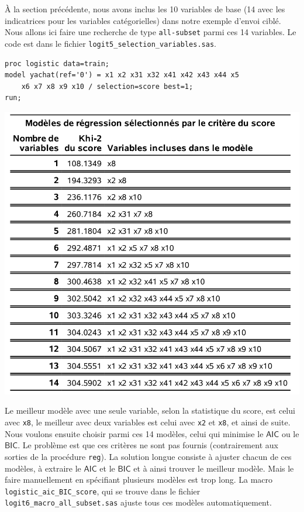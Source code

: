 \documentclass[
  11pt,
  letterpaper,
]{book}
\theoremstyle{definition}
\theoremstyle{definition}
\theoremstyle{definition}
\theoremstyle{remark}
\begin{document}
À la section précédente, nous avons inclus les 10 variables de base (14 avec les indicatrices pour les variables catégorielles) dans notre exemple d'envoi ciblé. Nous allons ici faire une recherche de type \texttt{all-subset} parmi ces 14 variables. Le code est dans le fichier \texttt{logit5\_selection\_variables.sas}.

\begin{verbatim}
proc logistic data=train;
model yachat(ref='0') = x1 x2 x31 x32 x41 x42 x43 x44 x5 
    x6 x7 x8 x9 x10 / selection=score best=1;
run;
\end{verbatim}

\begin{center}\includegraphics[width=0.8\linewidth]{figures/03-logistic-e20} \end{center}

Le meilleur modèle avec une seule variable, selon la statistique du score, est celui avec \texttt{x8}, le meilleur avec deux variables est celui avec \texttt{x2} et \texttt{x8}, et ainsi de suite. Nous voulons ensuite choisir parmi ces 14 modèles, celui qui minimise le \(\mathsf{AIC}\) ou le \(\mathsf{BIC}\). Le problème est que ces critères ne sont pas fournis (contrairement aux sorties de la procédure \texttt{reg}). La solution longue consiste à ajuster chacun de ces modèles, à extraire le \(\mathsf{AIC}\) et le \(\mathsf{BIC}\) et à ainsi trouver le meilleur modèle. Mais le faire manuellement en spécifiant plusieurs modèles est trop long. La macro \texttt{logistic\_aic\_BIC\_score}, qui se trouve dans le fichier \texttt{logit6\_macro\_all\_subset.sas} ajuste tous ces modèles automatiquement.
\end{document}
